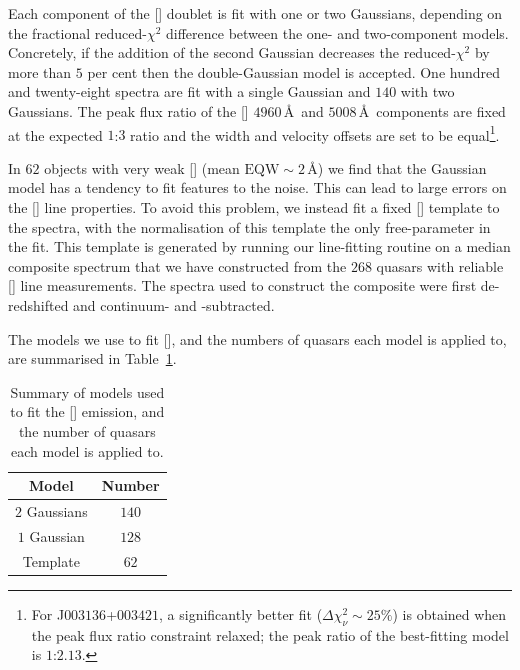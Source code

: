 Each component of the [] doublet is fit with one or two Gaussians, depending on the fractional reduced-$\chi^2$ difference between the one- and two-component models. 
Concretely, if the addition of the second Gaussian decreases the reduced-$\chi^2$ by more than $5$ per cent then the double-Gaussian model is accepted.
One hundred and twenty-eight spectra are fit with a single Gaussian and $140$ with two Gaussians. 
The peak flux ratio of the [] $4960$\,\AA\, and $5008$\,\AA\, components are fixed at the expected $1$:$3$ ratio and the width and velocity offsets are set to be equal\footnote{For J$003136$+$003421$, a significantly better fit ($\Delta \chi^2_{\nu} \sim 25\%$) is obtained when the peak flux ratio constraint relaxed; the peak ratio of the best-fitting model is $1$:$2.13$.}.

In $62$ objects with very weak [] (mean $\text{EQW}\sim2$\,\AA) we find that the Gaussian model has a tendency to fit features to the noise. 
This can lead to large errors on the [] line properties. 
To avoid this problem, we instead fit a fixed [] template to the spectra, with the normalisation of this template the only free-parameter in the fit.
This template is generated by running our line-fitting routine on a median composite spectrum that we have constructed from the $268$ quasars with reliable [] line measurements.  
The spectra used to construct the composite were first de-redshifted and continuum- and -subtracted.  

The models we use to fit [], and the numbers of quasars each model is applied to, are summarised in Table~\ref{tab:oiiimod}.

\begin{table}
  \centering
  \footnotesize 
    \begin{tabular}{cc} 
    \hline
    Model & Number \\
    \hline
    $2$ Gaussians &  $140$ \\
    $1$ Gaussian  &  $128$ \\
    Template &  $62$ \\
    \hline
    \end{tabular}
    \caption[{Summary of models used to fit the [] emission, and the number of quasars each model is applied to.}]{Summary of models used to fit the [] emission, and the number of quasars each model is applied to.}
  \label{tab:oiiimod}
\end{table} 

